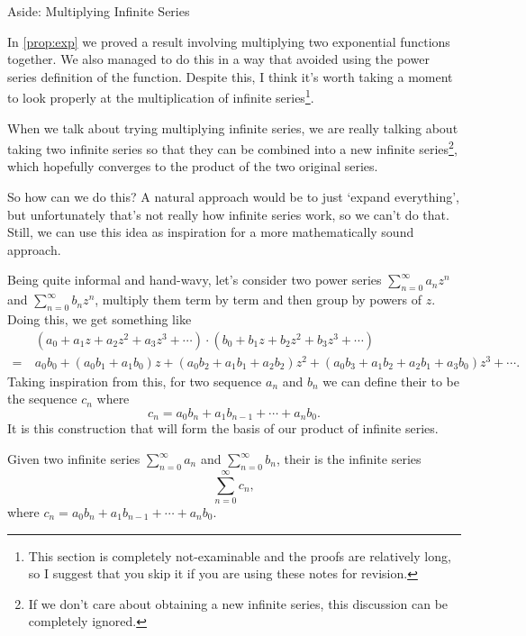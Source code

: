 \documentclass[a4paper]{scrartcl}
\begin{document}
\begin{aside}{Aside: Multiplying Infinite Series}

In \autoref{prop:exp} we proved a result involving multiplying two exponential functions together. We also managed to do this in a way that avoided using the power series definition of the function. Despite this, I think it's worth taking a moment to look properly at the multiplication of infinite series\footnote{This section is completely not-examinable and the proofs are relatively long, so I suggest that you skip it if you are using these notes for revision.}.

When we talk about trying multiplying infinite series, we are really talking about taking two infinite series so that they can be combined into a new infinite series\footnote{If we don't care about obtaining a new infinite series, this discussion can be completely ignored.}, which hopefully converges to the product of the two original series.

So how can we do this? A natural approach would be to just `expand everything', but unfortunately that's not really how infinite series work, so we can't do that. Still, we can use this idea as inspiration for a more mathematically sound approach. 

Being quite informal and hand-wavy, let's consider two power series $\sum_{n = 0}^{\infty} a_n z^n$ and $\sum_{n = 0}^{\infty} b_n z^n$, multiply them term by term and then group by powers of $z$. Doing this, we get something like 
\begin{align*}
	&(a_0 + a_1 z + a_2 z^2 + a_3 z^3 + \cdots) \cdot (b_0 + b_1 z + b_2 z^2 + b_3z^3 + \cdots)\\
	=\ & a_0 b_0 + (a_0 b_1 + a_1 b_0) z + (a_0 b_2 + a_1 b_1 + a_2 b_2) z^2 + (a_0 b_3 + a_1 b_2 + a_2 b_1 + a_3 b_0) z^3 + \cdots.
\end{align*}
Taking inspiration from this, for two sequence $a_n$ and $b_n$ we can define their  to be the sequence $c_n$ where
$$
	c_n = a_0 b_n + a_1 b_{n - 1} + \cdots + a_n b_0.
$$
It is this construction that will form the basis of our product of infinite series.

\begin{definition*}
	Given two infinite series $\sum_{n = 0}^{\infty} a_n$ and $\sum_{n = 0}^{\infty} b_n$, their  is the infinite series
	$$
	\sum_{n = 0}^{\infty} c_n,
	$$
	where $c_n = a_0 b_n + a_1 b_{n - 1} + \cdots + a_n b_0$.
\end{definition*}


\end{aside}
\end{document}
